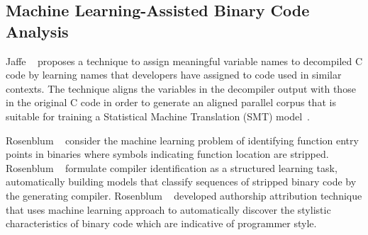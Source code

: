 \subsection{Machine Learning-Assisted Binary Code Analysis}

Jaffe \etal~\cite{Jaffe:2018ICPC} proposes a technique to assign meaningful
variable names to decompiled C code by learning names that developers have
assigned to code used in similar contexts. The technique aligns the variables
in the decompiler output with those in the original C code in order to generate
an aligned parallel corpus that is suitable for training a Statistical Machine
Translation (SMT) model~\cite{Koehn:2007}.  

Rosenblum \etal~\cite{Rosenblum2007,Rosenblum:2008,Bao:2014,Shin:2015} consider
the machine learning problem of identifying function entry points in binaries
where symbols indicating function location are stripped.
%
Rosenblum \etal~\cite{Rosenblum:2010} formulate compiler identification as a
structured learning task, automatically building models that classify sequences
of stripped binary code by the generating compiler.
%
Rosenblum \etal~\cite{Rosenblum:2011} developed authorship attribution
technique that uses machine learning approach to automatically discover the
stylistic characteristics of binary code which are indicative of programmer
style.
